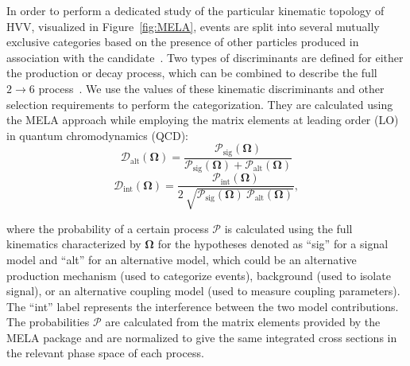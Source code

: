 In order to perform a dedicated study of the particular kinematic topology of HVV, visualized in Figure~\ref{fig:MELA}, events are split into several mutually exclusive categories based on the presence of other particles produced in association with the \Hboson candidate~\cite{Sirunyan:2021rug}. Two types of discriminants are defined for either the production or decay process, which can be combined to describe the full $2\to 6$ process~\cite{Sirunyan:2017exp,Sirunyan:2017tqd,Sirunyan:2019twz,Sirunyan:2021rug}. We use the values of these kinematic discriminants and other selection requirements to perform the categorization. They are calculated using the MELA approach while employing the matrix elements at leading order (LO) in quantum chromodynamics (QCD):
\begin{equation}
	\mathcal{D}_\mathrm{alt}\left(\boldsymbol{\Omega}\right) = \frac{\mathcal{P}_\text{sig}\left(\boldsymbol{\Omega}\right) }
	{\mathcal{P}_\text{sig}\left(\boldsymbol{\Omega}\right) +\mathcal{P}_\mathrm{alt}\left(\boldsymbol{\Omega}\right) }
	\label{eq:melaD}
\end{equation}
\begin{equation}
	\mathcal{D}_\mathrm{int}\left(\boldsymbol{\Omega}\right) =
	\frac{\mathcal{P}_\mathrm{int}\left(\boldsymbol{\Omega}\right) }
	{2 \ \sqrt{{\mathcal{P}_\text{sig}\left(\boldsymbol{\Omega}\right) \ \mathcal{P}_\mathrm{alt}\left(\boldsymbol{\Omega}\right) }}},
	\label{eq:melaDint}
\end{equation}

where the probability of a certain process $\mathcal{P}$ is calculated using the full kinematics characterized
by $\boldsymbol{\Omega}$ for the hypotheses denoted as ``sig'' for a signal model and ``alt'' for an alternative model,
which could be an alternative \Hboson production mechanism (used to categorize events),
background (used to isolate signal), or an alternative \Hboson coupling model (used to measure coupling parameters).
The ``int'' label represents the interference between the two model contributions.
The probabilities $\mathcal{P}$ are calculated from the matrix elements provided by the MELA package and
are normalized to give the same integrated cross sections in the relevant phase space of each process.


